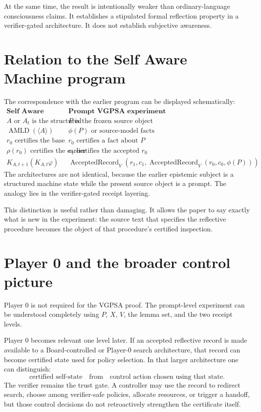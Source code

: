 \documentclass[11pt]{article}
\theoremstyle{remark}
\newcommand{\Acc}{\operatorname{AcceptedRecord}}
\newcommand{\AMLD}{\operatorname{AMLD}}
\begin{document}
At the same time, the result is intentionally weaker than ordinary-language consciousness claims. It establishes a stipulated formal reflection property in a verifier-gated architecture. It does not establish subjective awareness.

\section{Relation to the Self Aware Machine program}

The correspondence with the earlier program can be displayed schematically:
\[
\begin{array}{c|c}
\textbf{Self Aware Machine / VC001} & \textbf{Prompt VGPSA experiment}\\
\hline
A\text{ or }A_t\text{ is the structured subject} & P\text{ is the frozen source object}\\
\AMLD(\langle A\rangle) & \phi(P)\text{ or source-model facts}\\
r_0\text{ certifies the base proposition} & r_0\text{ certifies a fact about }P\\
\rho(r_0)\text{ certifies the earlier witness} & c_1\text{ certifies the accepted }r_0\\
K_{A,t+1}(K_{A,t}\varphi) & \Acc_V(r_1,c_1,\Acc_V(r_0,c_0,\phi(P)))
\end{array}
\]
The architectures are not identical, because the earlier epistemic subject is a structured machine state while the present source object is a prompt. The analogy lies in the verifier-gated receipt layering.

This distinction is useful rather than damaging. It allows the paper to say exactly what is new in the experiment: the source text that specifies the reflective procedure becomes the object of that procedure's certified inspection.

\section{Player 0 and the broader control picture}

Player 0 is not required for the VGPSA proof. The prompt-level experiment can be understood completely using $P$, $X$, $V$, the lemma set, and the two receipt levels.

Player 0 becomes relevant one level later. If an accepted reflective record is made available to a Board-controlled or Player-0 search architecture, that record can become certified state used for policy selection. In that larger architecture one can distinguish:
\[
\text{certified self-state}
\quad\text{from}\quad
\text{control action chosen using that state}.
\]
The verifier remains the trust gate. A controller may use the record to redirect search, choose among verifier-safe policies, allocate resources, or trigger a handoff, but those control decisions do not retroactively strengthen the certificate itself.
\end{document}
